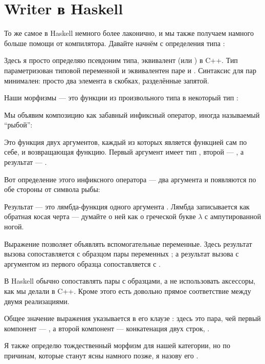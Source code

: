 \section{Writer в Haskell}

То же самое в Haskell немного более лаконично, и мы также получаем
намного больше помощи от компилятора. Давайте начнём с определения типа :

Здесь я просто определяю псевдоним типа, эквивалент 
(или ) в C++. Тип  параметризован
типовой переменной  и эквивалентен паре  и
. Синтаксис для пар минимален: просто два элемента в
скобках, разделённые запятой.

Наши морфизмы --- это функции из произвольного типа в некоторый
тип :

Мы объявим композицию как забавный инфиксный оператор, иногда
называемый ``рыбой'':

Это функция двух аргументов, каждый из которых является функцией сам по себе, и
возвращающая функцию. Первый аргумент имеет тип
, второй ---
, а результат ---
.

Вот определение этого инфиксного оператора --- два аргумента
 и  появляются по обе стороны от символа
рыбы:

Результат --- это лямбда-функция одного аргумента . Лямбда
записывается как обратная косая черта --- думайте о ней как о греческой букве $\lambda$ с
ампутированной ногой.

Выражение  позволяет объявлять вспомогательные переменные. Здесь
результат вызова  сопоставляется с образцом пары
переменных ; а результат вызова 
с аргументом  из первого образца сопоставляется с
.

В Haskell обычно сопоставлять пары с образцами, а не использовать
аксессоры, как мы делали в C++. Кроме этого есть довольно
прямое соответствие между двумя реализациями.

Общее значение выражения  указывается в его
клаузе : здесь это пара, чей первый компонент --- ,
а второй компонент --- конкатенация двух строк,
.

Я также определю тождественный морфизм для нашей категории, но по
причинам, которые станут ясны намного позже, я назову его
.

